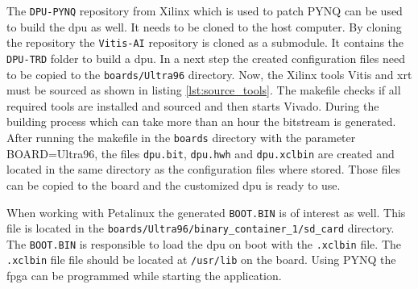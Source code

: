 The \texttt{DPU-PYNQ} repository from Xilinx which is used to patch PYNQ can be used to build the \acrshort{dpu} as well.
It needs to be cloned to the host computer.
By cloning the repository the \texttt{Vitis-AI} repository is cloned as a submodule.
It contains the \texttt{DPU-TRD} folder to build a \acrshort{dpu}.
In a next step the created configuration files need to be copied to the \texttt{boards/Ultra96} directory.
Now, the Xilinx tools Vitis and \acrshort{xrt} must be sourced as shown in listing \ref{lst:source_tools}.
The makefile checks if all required tools are installed and sourced and then starts Vivado.
During the building process which can take more than an hour the bitstream is generated. 
After running the makefile in the \texttt{boards} directory with the parameter BOARD=Ultra96, the files \texttt{dpu.bit}, \texttt{dpu.hwh} and \texttt{dpu.xclbin} are created and located in the same directory as the configuration files where stored.
Those files can be copied to the board and the customized \acrshort{dpu} is ready to use.

When working with Petalinux the generated \texttt{BOOT.BIN} is of interest as well.
This file is located in the \texttt{boards/Ultra96/binary\_container\_1/sd\_card} directory.
The \texttt{BOOT.BIN} is responsible to load the \acrshort{dpu} on boot with the \texttt{.xclbin} file.
The \texttt{.xclbin} file file should be located at \texttt{/usr/lib} on the board.
Using PYNQ the \acrshort{fpga} can be programmed while starting the application.

